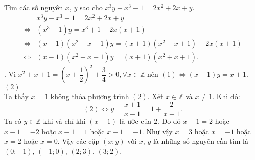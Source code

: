 \begin{bt}%
	Tìm các số nguyên  $x$, $y$  sao cho $x^{3}y-x^{3}-1=2x^{2}+2x+y$.
	\loigiai
	{
		\begin{align*}
			&x^3y - x^3 - 1 = 2x^2 + 2x + y \\
			\Leftrightarrow& (x^3 - 1)y = x^3 + 1 + 2x(x + 1)\\
			\Leftrightarrow& (x - 1)(x^2 + x + 1)y = (x + 1)(x^2 - x + 1) + 2x(x + 1)\\                         
			\Leftrightarrow& (x - 1)(x^2 + x + 1)y = (x + 1)(x^2 + x + 1).\tag{1}
		\end{align*}.
		Vì $x^2 + x + 1 = \left( x + \dfrac{1}{2} \right)^2 + \dfrac{3}{4} > 0,\forall x \in \mathbb{Z}$ nên 
		$(1) \Leftrightarrow (x - 1)y = x + 1$.\hfill$(2)$\\
		Ta thấy $x = 1$ không thỏa phương trình $(2)$. Xét $x \in \mathbb{Z}$ và $x \ne 1$. Khi đó:
		\[(2) \Leftrightarrow y = \dfrac{x + 1}{x - 1} = 1 + \dfrac{2}{x - 1}.\]
		Ta có $y \in \mathbb{Z}$ khi và chỉ khi $\left( x - 1 \right)$ là ước của $2$. 
		Do đó $x - 1 = 2$ hoặc $x - 1 =  - 2$ hoặc $x - 1 = 1$ hoặc $x - 1 =  - 1$. Như vậy $x = 3$ hoặc $x =  - 1$ hoặc $x = 2$ hoặc $x = 0$.        Vậy các cặp $(x;y)$ với $x$, $y$ là những số nguyên cần tìm là $(0; - 1)$, $( - 1;0)$, $(2;3)$, $(3;2)$.
	}
\end{bt}

